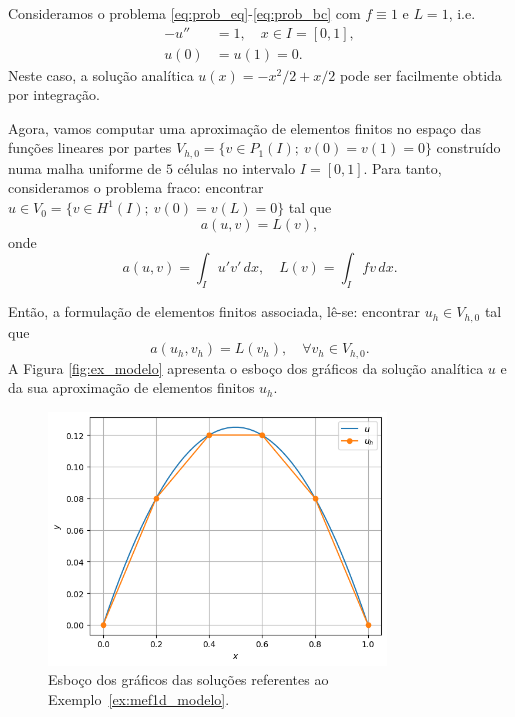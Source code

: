 \begin{ex}\label{ex:mef1d_modelo}
  Consideramos o problema \eqref{eq:prob_eq}-\eqref{eq:prob_bc} com $f\equiv 1$ e $L=1$, i.e.
  \begin{align}
    -u'' &= 1,\quad x\in I=[0,1],\label{eq:ex_modelo_eq}\\
    u(0) &= u(1) = 0.\label{eq:ex_modelo_bc}
  \end{align}
Neste caso, a solução analítica $u(x) = -x^2/2+x/2$ pode ser facilmente obtida por integração.

Agora, vamos computar uma aproximação de elementos finitos no espaço das funções lineares por partes $V_{h,0} = \{v\in P_1(I);~v(0)=v(1)=0\}$ construído numa malha uniforme de $5$ células no intervalo $I=[0, 1]$. Para tanto, consideramos o problema fraco: encontrar $u\in V_0 = \{v\in H^1(I);~v(0)=v(L)=0\}$ tal que
\begin{equation}
  a(u, v) = L(v),
\end{equation}
onde
\begin{equation}
  a(u, v) = \int_I u'v'\,dx,\quad L(v)=\int_I fv\,dx.
\end{equation}

Então, a formulação de elementos finitos associada, lê-se: encontrar $u_h\in V_{h,0}$ tal que
\begin{equation}
  a(u_h, v_h) = L(v_h),\quad\forall v_h\in V_{h,0}.
\end{equation}
A Figura \ref{fig:ex_modelo} apresenta o esboço dos gráficos da solução analítica $u$ e da sua aproximação de elementos finitos $u_h$.

\begin{figure}[h!]
  \centering
  \includegraphics[width=0.8\textwidth]{./cap_mef1d/dados/ex_mef1d_modelo/fig}
  \caption{Esboço dos gráficos das soluções referentes ao Exemplo~\ref{ex:mef1d_modelo}.}
  \label{fig:ex_mef1d_modelo}
\end{figure}


\end{ex}
